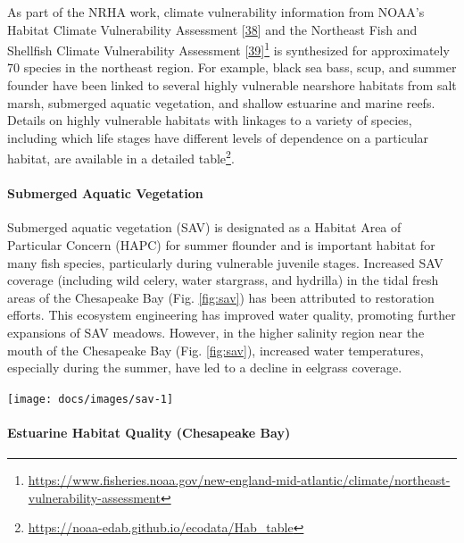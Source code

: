 \documentclass[
  10pt,
]{article}
\let\origfigure\figure
\let\endorigfigure\endfigure
\renewenvironment{figure}[1][2] {
    \expandafter\origfigure\expandafter[H]
} {
    \endorigfigure
}
\begin{document}
As part of the NRHA work, climate vulnerability information from NOAA's
Habitat Climate Vulnerability Assessment
{[}\protect\hyperlink{ref-farr_assessment_2021}{38}{]} and the Northeast
Fish and Shellfish Climate Vulnerability Assessment
{[}\protect\hyperlink{ref-hare_vulnerability_2016}{39}{]}\footnote{\url{https://www.fisheries.noaa.gov/new-england-mid-atlantic/climate/northeast-vulnerability-assessment}}
is synthesized for approximately 70 species in the northeast region. For
example, black sea bass, scup, and summer founder have been linked to
several highly vulnerable nearshore habitats from salt marsh, submerged
aquatic vegetation, and shallow estuarine and marine reefs. Details on
highly vulnerable habitats with linkages to a variety of species,
including which life stages have different levels of dependence on a
particular habitat, are available in a detailed table\footnote{\url{https://noaa-edab.github.io/ecodata/Hab_table}}.

\hypertarget{submerged-aquatic-vegetation}{%
\paragraph{Submerged Aquatic
Vegetation}\label{submerged-aquatic-vegetation}}

Submerged aquatic vegetation (SAV) is designated as a Habitat Area of
Particular Concern (HAPC) for summer flounder and is important habitat
for many fish species, particularly during vulnerable juvenile stages.
Increased SAV coverage (including wild celery, water stargrass, and
hydrilla) in the tidal fresh areas of the Chesapeake Bay (Fig.
\ref{fig:sav}) has been attributed to restoration efforts. This
ecosystem engineering has improved water quality, promoting further
expansions of SAV meadows. However, in the higher salinity region near
the mouth of the Chesapeake Bay (Fig. \ref{fig:sav}), increased water
temperatures, especially during the summer, have led to a decline in
eelgrass coverage.

\begin{figure}

{\centering \texttt{[image: docs/images/sav-1]} 

}

\caption{Submerged Aquatic Vegetation (SAV) coverage in tidal fresh and high salinity regions of the Chesapeake Bay.}\label{fig:sav}
\end{figure}

\hypertarget{estuarine-habitat-quality-chesapeake-bay}{%
\paragraph{Estuarine Habitat Quality (Chesapeake
Bay)}\label{estuarine-habitat-quality-chesapeake-bay}}
\end{document}
